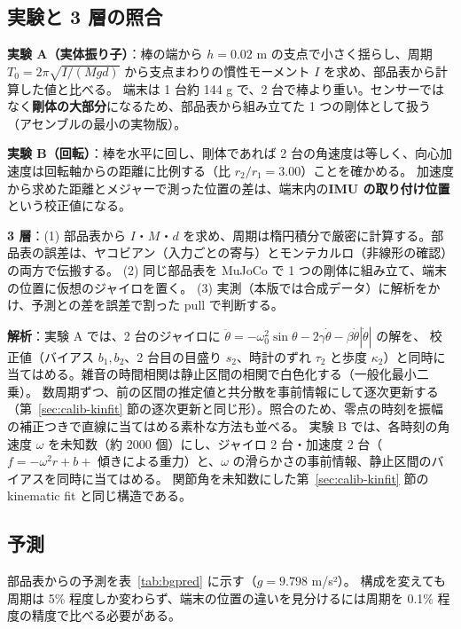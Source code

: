 \documentclass[paper=a4paper,fontsize=10pt,twocolumn,column_gap=2zw,line_length=24zw,number_of_lines=46,head_space=20mm]{jlreq}
\begin{document}
\subsection{実験と 3 層の照合}

\textbf{実験 A（実体振り子）}：棒の端から $h=0.02$ m の支点で小さく揺らし、周期 $T_0=2\pi\sqrt{I/(Mgd)}$ から支点まわりの慣性モーメント $I$ を求め、部品表から計算した値と比べる。
端末は 1 台約 144 g で、2 台で棒より重い。センサーではなく\textbf{剛体の大部分}になるため、部品表から組み立てた 1 つの剛体として扱う（アセンブルの最小の実物版）。

\textbf{実験 B（回転）}：棒を水平に回し、剛体であれば 2 台の角速度は等しく、向心加速度は回転軸からの距離に比例する（比 $r_2/r_1 = 3.00$）ことを確かめる。
加速度から求めた距離とメジャーで測った位置の差は、端末内の\textbf{IMU の取り付け位置}という校正値になる。

\textbf{3 層}：(1) 部品表から $I$・$M$・$d$ を求め、周期は楕円積分で厳密に計算する。部品表の誤差は、ヤコビアン（入力ごとの寄与）とモンテカルロ（非線形の確認）の両方で伝搬する。
(2) 同じ部品表を MuJoCo で 1 つの剛体に組み立て、端末の位置に仮想のジャイロを置く。
(3) 実測（本版では合成データ）に解析をかけ、予測との差を誤差で割った pull で判断する。

\textbf{解析}：実験 A では、2 台のジャイロに $\ddot\theta = -\omega_0^2\sin\theta - 2\gamma\dot\theta - \beta\dot\theta|\dot\theta|$ の解を、
校正値（バイアス $b_1, b_2$、2 台目の目盛り $s_2$、時計のずれ $\tau_2$ と歩度 $\kappa_2$）と同時に当てはめる。雑音の時間相関は静止区間の相関で白色化する（一般化最小二乗）。
数周期ずつ、前の区間の推定値と共分散を事前情報にして逐次更新する（第~\ref{sec:calib-kinfit} 節の逐次更新と同じ形）。照合のため、零点の時刻を振幅の補正つきで直線に当てはめる素朴な方法も並べる。
実験 B では、各時刻の角速度 $\omega$ を未知数（約 2000 個）にし、ジャイロ 2 台・加速度 2 台（$f=-\omega^2 r + b + $ 傾きによる重力）と、$\omega$ の滑らかさの事前情報、静止区間のバイアスを同時に当てはめる。
関節角を未知数にした第~\ref{sec:calib-kinfit} 節の kinematic fit と同じ構造である。

\subsection{予測}

部品表からの予測を表~\ref{tab:bgpred} に示す（$g=9.798$ m/s²）。
構成を変えても周期は 5\% 程度しか変わらず、端末の位置の違いを見分けるには周期を 0.1\% 程度の精度で比べる必要がある。
\end{document}
